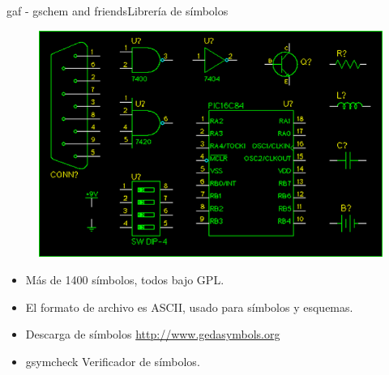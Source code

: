 \documentclass{beamer}
\begin{document}



\begin{frame}{gaf - gschem and friends}{Librería de símbolos}
  \begin{figure}[!h]
    \centering
    \includegraphics[scale=0.25]{img/simbolos.png}
  \end{figure}
  \begin{itemize}
  \item Más de 1400 símbolos, todos bajo GPL.
  \item El formato de archivo es ASCII, usado para símbolos y esquemas.
  \item Descarga de símbolos \url{http://www.gedasymbols.org}
  \item \alert{gsymcheck} Verificador de símbolos.
  \end{itemize}
\end{frame}
\end{document}
